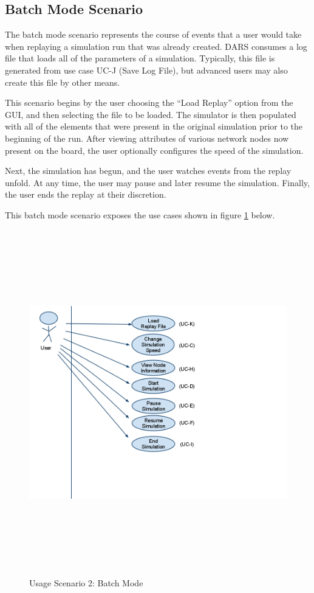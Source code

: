 \documentclass[a4paper,11pt,titlepage]{article}
\begin{document}
\subsection{Batch Mode Scenario}
The batch mode scenario represents the course of events that a user would take when replaying a simulation run that was already created. DARS consumes a log file that loads all of the parameters of a simulation. Typically, this file is generated from use case UC-J (Save Log File), but advanced users may also create this file by other means.

This scenario begins by the user choosing the ``Load Replay'' option from the GUI, and then selecting the file to be loaded. The simulator is then populated with all of the elements that were present in the original simulation prior to the beginning of the run. After viewing attributes of various network nodes now present on the board, the user optionally configures the speed of the simulation. 

Next, the simulation has begun, and the user watches events from the replay unfold. At any time, the user may pause and later resume the simulation. Finally, the user ends the replay at their discretion.
 
This batch mode scenario exposes the use cases shown in figure \ref{fig:scen2} below.

\begin{figure}[H]
        \centering
	\includegraphics[height=150mm]{img/scenario2.png}
        \caption{Usage Scenario 2: Batch Mode}
        \label{fig:scen2}
\end{figure}
\end{document}
